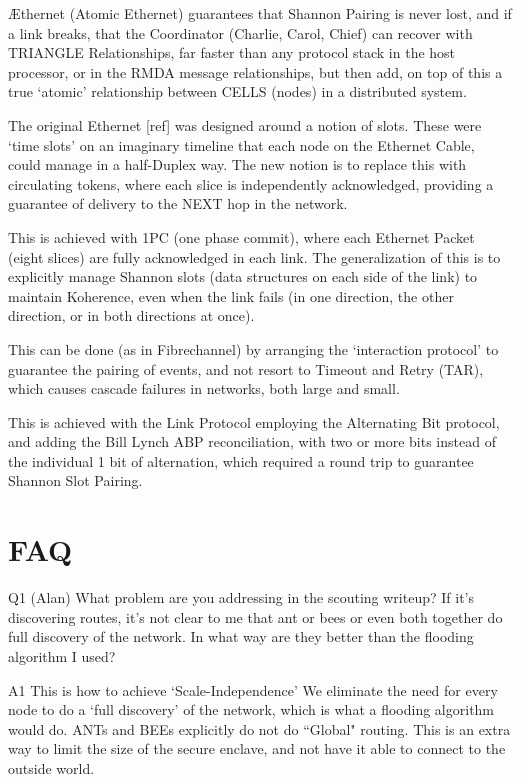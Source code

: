 \documentclass[../HFT-main.tex]{subfiles}
\begin{document}
Æthernet (Atomic Ethernet) guarantees that Shannon Pairing is never lost, and if a link breaks, that the Coordinator (Charlie, Carol, Chief) can recover with TRIANGLE Relationships, far faster than any protocol stack in the host processor, or in the RMDA message relationships, but then add, on top of this a true `atomic' relationship between CELLS (nodes) in a distributed system.

The original Ethernet [ref] was designed around a notion of slots. These were `time slots' on an imaginary timeline that each node on the Ethernet Cable, could manage in a half-Duplex way.  The new notion is to replace this with circulating tokens, where each slice is independently acknowledged, providing a guarantee of delivery to the NEXT hop in the network.

This is achieved with 1PC (one phase commit), where each Ethernet Packet (eight slices) are fully acknowledged in each link. The generalization of this is to explicitly manage Shannon slots (data structures on each side of the link) to maintain Koherence, even when the link fails (in one direction, the other direction, or in both directions at once).

This can be done (as in Fibrechannel)  by arranging the `interaction protocol' to guarantee the pairing of events, and not resort to Timeout and Retry (TAR), which causes cascade failures in networks, both large and small.

This is achieved with the Link Protocol employing the Alternating Bit protocol, and adding the Bill Lynch ABP reconciliation, with two or more bits instead of the individual 1 bit of alternation, which required a round trip to guarantee Shannon Slot Pairing.



\section{FAQ}

Q1 (Alan) What problem are you addressing in the scouting writeup?  If it’s discovering routes, it’s not clear to me that ant or bees or even both together do full discovery of the network.  In what way are they better than the flooding algorithm I used?

A1 This is how to achieve `Scale-Independence' We eliminate the need for   every node  to do a `full discovery' of the network, which is what a flooding algorithm would do.  ANTs and BEEs explicitly do not do ``Global" routing. This is an extra way to limit the size of the secure enclave, and not have it able to connect to the outside world.  
\end{document}
